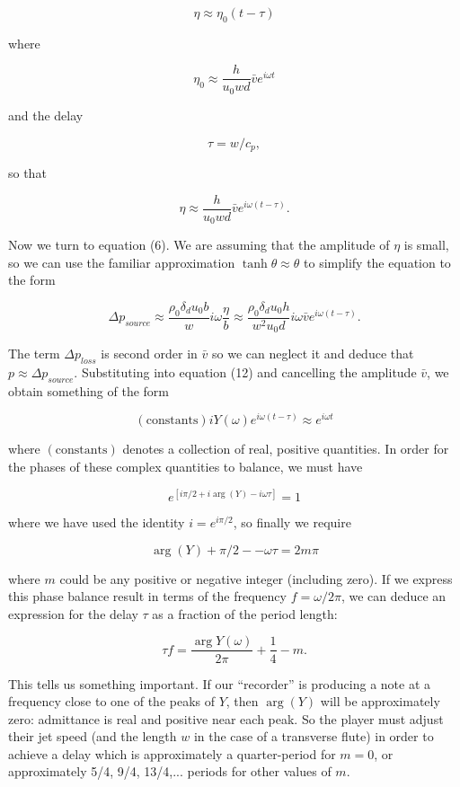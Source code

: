   $$\eta \approx \eta_0(t-\tau) \tag{13}$$ 

  where 

  $$\eta_0 \approx \dfrac{h}{u_0 w d} \bar{v} e^{i \omega t} \tag{14}$$ 

  and the delay 

  $$\tau=w/c_p, \tag{15}$$ 

  so that 

  $$\eta \approx \dfrac{h}{u_0 w d} \bar{v} e^{i \omega (t-\tau)} . \tag{16}$$ 

  Now we turn to equation (6). We are assuming that the amplitude of $\eta$ is 
  small, so we can use the familiar approximation $\tanh \theta \approx \theta$ 
  to simplify the equation to the form 

  $$\Delta p_{source} \approx \dfrac{\rho_0 \delta_d u_0 b}{w} i \omega 
  \dfrac{\eta}{b} \approx \dfrac{\rho_0 \delta_d u_0 h}{w^2 u_0 d} i \omega 
  \bar{v} e^{i \omega (t-\tau)} . \tag{17}$$ 

  The term $\Delta p_{loss}$ is second order in $\bar{v}$ so we can neglect it 
  and deduce that $p \approx \Delta p_{source}$. Substituting into equation 
  (12) and cancelling the amplitude $\bar{v}$, we obtain something of the form 

  $$(\mathrm{constants})i Y(\omega) e^{i \omega (t-\tau)} \approx e^{i \omega 
  t} \tag{18}$$ 

  where $(\mathrm{constants})$ denotes a collection of real, positive 
  quantities. In order for the phases of these complex quantities to balance, 
  we must have 

  $$e^{[i \pi/2 +i \arg(Y) -i \omega \tau]} = 1 \tag{19}$$ 

  where we have used the identity $i = e^{i \pi/2}$, so finally we require 

  $$\arg(Y) + \pi/2 -- \omega \tau = 2m \pi \tag{20}$$ 

  where $m$ could be any positive or negative integer (including zero). If we 
  express this phase balance result in terms of the frequency $f=\omega/2 \pi$, 
  we can deduce an expression for the delay $\tau$ as a fraction of the period 
  length: 

  $$\tau f= \dfrac{\arg Y(\omega)}{2 \pi} + \dfrac{1}{4} -m . \tag{21}$$ 

  This tells us something important. If our ``recorder'' is producing a note at 
  a frequency close to one of the peaks of $Y$, then $\arg (Y)$ will be 
  approximately zero: admittance is real and positive near each peak. So the 
  player must adjust their jet speed (and the length $w$ in the case of a 
  transverse flute) in order to achieve a delay which is approximately a 
  quarter-period for $m=0$, or approximately 5/4, 9/4, 13/4,... periods for 
  other values of $m$. 

